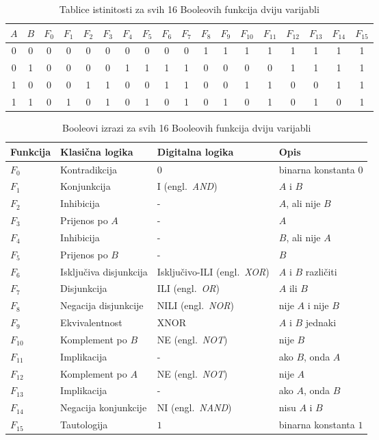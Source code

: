 \documentclass[times, utf8, diplomski]{fer}
\begin{document}
\begin{table}[htb]
	\centering
	\caption{Tablice istinitosti za svih 16 Booleovih funkcija dviju varijabli}
	\label{tab:16funcs}
	\begin{tabular}{|cc|cccccccccccccccc|}
		\hline
		$A$ & $B$ & $F_{0}$ & $F_{1}$ & $F_{2}$ & $F_{3}$ & $F_{4}$ & $F_{5}$ & $F_{6}$ & $F_{7}$ & $F_{8}$ & $F_{9}$ & $F_{10}$ & $F_{11}$ & $F_{12}$ & $F_{13}$ & $F_{14}$ & $F_{15}$ \\
		\hline
		0 & 0 & 0 & 0 & 0 & 0 & 0 & 0 & 0 & 0 & 1 & 1 & 1 & 1 & 1 & 1 & 1 & 1 \\
		0 & 1 & 0 & 0 & 0 & 0 & 1 & 1 & 1 & 1 & 0 & 0 & 0 & 0 & 1 & 1 & 1 & 1 \\
		1 & 0 & 0 & 0 & 1 & 1 & 0 & 0 & 1 & 1 & 0 & 0 & 1 & 1 & 0 & 0 & 1 & 1 \\
		1 & 1 & 0 & 1 & 0 & 1 & 0 & 1 & 0 & 1 & 0 & 1 & 0 & 1 & 0 & 1 & 0 & 1 \\
		\hline
	\end{tabular}
\end{table}

\begin{table}[htb]
	\centering
	\caption{Booleovi izrazi za svih 16 Booleovih funkcija dviju varijabli}
	\label{tab:16expr}
	\begin{tabular}{|l|l|l|l|}
		\hline
		Funkcija 	& Klasična logika 			& Digitalna logika 			& Opis \\
		\hline
		$F_{0}$ 	& Kontradikcija 			& $0$ 						& binarna konstanta $0$ \\
		$F_{1}$ 	& Konjunkcija 				& I (engl.~\textit{AND}) 	& $A$ i $B$ \\
		$F_{2}$ 	& Inhibicija 				& - 						& $A$, ali nije $B$ \\
		$F_{3}$ 	& Prijenos po $A$ 			& - 						& $A$ \\
		$F_{4}$ 	& Inhibicija 				& - 						& $B$, ali nije $A$ \\
		$F_{5}$ 	& Prijenos po $B$ 			& - 						& $B$ \\
		$F_{6}$ 	& Isključiva disjunkcija 	& Isključivo-ILI (engl.~\textit{XOR}) & $A$ i $B$ različiti \\
		$F_{7}$ 	& Disjunkcija 				& ILI (engl.~\textit{OR}) 	& $A$ ili $B$ \\
		$F_{8}$ 	& Negacija disjunkcije 		& NILI (engl.~\textit{NOR}) & nije $A$ i nije $B$ \\
		$F_{9}$ 	& Ekvivalentnost 			& XNOR 						& $A$ i $B$ jednaki \\
		$F_{10}$ 	& Komplement po $B$ 		& NE (engl.~\textit{NOT}) 	& nije $B$ \\
		$F_{11}$ 	& Implikacija 				& - & ako $B$, onda $A$ \\
		$F_{12}$ 	& Komplement po $A$ 		& NE (engl.~\textit{NOT}) 	& nije $A$ \\
		$F_{13}$ 	& Implikacija 				& - & ako $A$, onda $B$ \\
		$F_{14}$ 	& Negacija konjunkcije 		& NI (engl.~\textit{NAND}) 	& nisu $A$ i $B$ \\
		$F_{15}$ 	& Tautologija 				& $1$ 						& binarna konstanta $1$ \\
		\hline
	\end{tabular}
\end{table}
\end{document}
